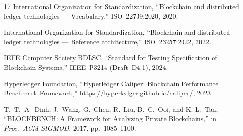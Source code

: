 \documentclass[10pt,twocolumn,letterpaper]{article}
\begin{document}
\begin{thebibliography}{17}
International Organization for Standardization,
``Blockchain and distributed ledger technologies --- Vocabulary,''
ISO~22739:2020, 2020.

International Organization for Standardization,
``Blockchain and distributed ledger technologies --- Reference architecture,''
ISO~23257:2022, 2022.

IEEE Computer Society BDLSC,
``Standard for Testing Specification of Blockchain Systems,''
IEEE~P3214 (Draft~D4.1), 2024.

Hyperledger Foundation,
``Hyperledger Caliper: Blockchain Performance Benchmark Framework,''
\url{https://hyperledger.github.io/caliper/}, 2023.

T.~T.~A.~Dinh, J.~Wang, G.~Chen, R.~Liu, B.~C.~Ooi, and K.-L.~Tan,
``BLOCKBENCH: A Framework for Analyzing Private Blockchains,''
in \emph{Proc.\ ACM SIGMOD}, 2017, pp.~1085--1100.

\end{thebibliography}
\end{document}
